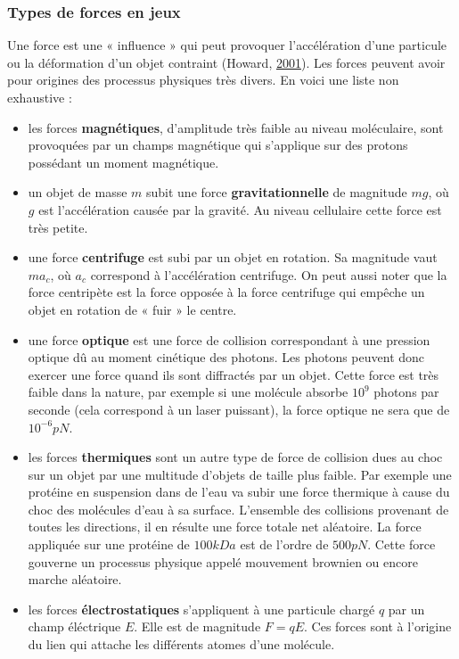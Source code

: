 \documentclass[12pt,a4paper,twoside,openright]{book}
\begin{document}
\subsubsection{Types de forces en jeux}\label{types-de-forces-en-jeux}

Une force est une « influence » qui peut provoquer l'accélération d'une
particule ou la déformation d'un objet contraint (Howard,
\hyperref[ref-Howard2001]{2001}). Les forces peuvent avoir pour origines
des processus physiques très divers. En voici une liste non exhaustive :

\begin{itemize}
\item
  les forces \textbf{magnétiques}, d'amplitude très faible au niveau
  moléculaire, sont provoquées par un champs magnétique qui s'applique
  sur des protons possédant un moment magnétique.
\item
  un objet de masse \(m\) subit une force \textbf{gravitationnelle} de
  magnitude \(mg\), où \(g\) est l'accélération causée par la gravité.
  Au niveau cellulaire cette force est très petite.
\item
  une force \textbf{centrifuge} est subi par un objet en rotation. Sa
  magnitude vaut \(ma_c\), où \(a_c\) correspond à l'accélération
  centrifuge. On peut aussi noter que la force centripète est la force
  opposée à la force centrifuge qui empêche un objet en rotation de «
  fuir » le centre.
\item
  une force \textbf{optique} est une force de collision correspondant à
  une pression optique dû au moment cinétique des photons. Les photons
  peuvent donc exercer une force quand ils sont diffractés par un objet.
  Cette force est très faible dans la nature, par exemple si une
  molécule absorbe \(10^9\) photons par seconde (cela correspond à un
  laser puissant), la force optique ne sera que de \(10^{-6}pN\).
\item
  les forces \textbf{thermiques} sont un autre type de force de
  collision dues au choc sur un objet par une multitude d'objets de
  taille plus faible. Par exemple une protéine en suspension dans de
  l'eau va subir une force thermique à cause du choc des molécules d'eau
  à sa surface. L'ensemble des collisions provenant de toutes les
  directions, il en résulte une force totale net aléatoire. La force
  appliquée sur une protéine de \(100kDa\) est de l'ordre de \(500pN\).
  Cette force gouverne un processus physique appelé mouvement brownien
  ou encore marche aléatoire.
\item
  les forces \textbf{électrostatiques} s'appliquent à une particule
  chargé \(q\) par un champ éléctrique \(E\). Elle est de magnitude
  \(F = qE\). Ces forces sont à l'origine du lien qui attache les
  différents atomes d'une molécule.
\end{itemize}
\end{document}
